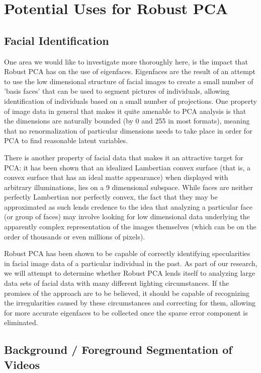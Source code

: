 \documentclass[11pt]{scrartcl} %
\theoremstyle{plain}
\begin{document}
\section{Potential Uses for Robust PCA}

\subsection{Facial Identification}
One area we would like to investigate more thoroughly here, is the impact that Robust PCA has on the use of eigenfaces. Eigenfaces are the result of an attempt to use the low dimensional structure of facial images to create a small number of 'basis faces' that can be used to segment pictures of individuals, allowing identification of individuals based on a small number of projections. One property of image data in general that makes it quite amenable to PCA analysis is that the dimensions are naturally bounded (by 0 and 255 in most formats), meaning that no renormalization of particular dimensions needs to take place in order for PCA to find reasonable latent variables.

There is another property of facial data that makes it an attractive target for PCA: it has been shown that an idealized Lambertian convex surface (that is, a convex surface that has an ideal matte appearance) when displayed with arbitrary illuminations, lies on a 9 dimensional subspace\cite{lambertian}. While faces are neither perfectly Lambertian nor perfectly convex, the fact that they may be approximated as such lends credence to the idea that analyzing a particular face (or group of faces) may involve looking for low dimensional data underlying the apparently complex representation of the images themselves (which can be on the order of thousands or even millions of pixels).

Robust PCA has been shown to be capable of correctly identifying specularities in facial image data of a particular individual in the past\cite{rpca}. As part of our research, we will attempt to determine whether Robust PCA lends itself to analyzing large data sets of facial data with many different lighting circumstances. If the promises of the approach are to be believed, it should be capable of recognizing the irregularities caused by these circumstances and correcting for them, allowing for more accurate eigenfaces to be collected once the sparse error component is eliminated. 

\subsection{Background / Foreground Segmentation of Videos}
\end{document}
